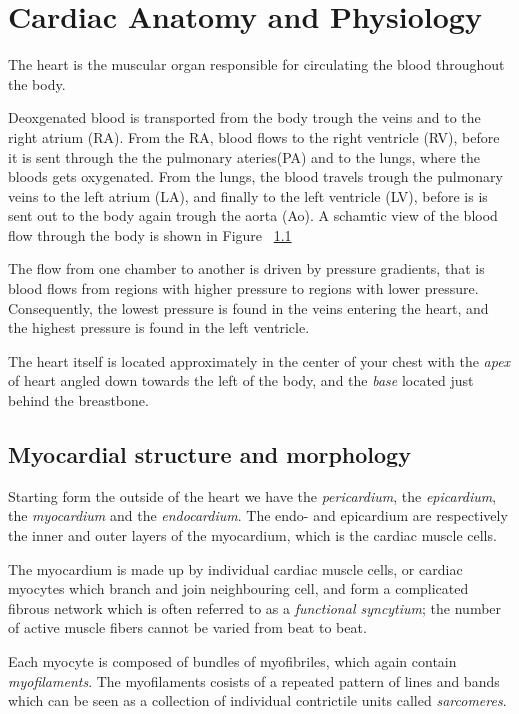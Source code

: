 \section{Cardiac Anatomy and Physiology}

The heart is the muscular organ responsible for circulating the blood
throughout the body. 

Deoxgenated blood is transported from the body trough the veins and to
the right atrium (RA). From the RA, blood flows to the right ventricle
(RV), before it is sent through the the pulmonary ateries(PA) and to the
lungs, where the bloods gets oxygenated. From the lungs, the blood
travels trough the pulmonary veins to the left atrium (LA), and
finally to the left ventricle (LV), before is is sent out to the body
again trough the aorta (Ao). A schamtic view of the blood flow
through the body is shown in Figure ~\ref{}

The flow from one chamber to another is driven
by pressure gradients, that is blood flows from regions with higher
pressure to regions with lower pressure. Consequently, the lowest
pressure is found in the veins entering the heart, and the highest
pressure is found in the left ventricle. 

The heart itself is located approximately in the center of your chest
with the \emph{apex} of heart angled down towards the left of the
body, and the \emph{base} located just behind the breastbone.



\subsection{Myocardial structure and morphology}

Starting form the outside of the heart we have the \emph{pericardium},
the \emph{epicardium}, the \emph{myocardium} and the \emph{endocardium}. 
The endo- and epicardium are respectively the inner and outer layers of the
myocardium, which is the cardiac muscle cells.

The myocardium is made up by individual cardiac muscle cells, or
cardiac myocytes which branch and join neighbouring cell, and form a
complicated fibrous network which is often referred to as a
\emph{functional syncytium}; the number of active muscle fibers cannot
be varied from beat to beat. 


Each myocyte is composed of bundles of myofibriles, which again
contain \emph{myofilaments}. The myofilaments cosists of a repeated pattern
of lines and bands which can be seen as a collection of individual
contrictile units called \emph{sarcomeres}. 

